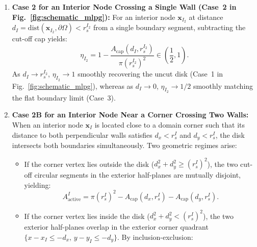 \documentclass[preprint,12pt]{elsarticle}
\begin{document}
\begin{enumerate}
          \begin{equation}
              \eta_B(d_{\parallel}) = \frac{1}{2} \left( 1 - \frac{A_{\mathrm{cap}}(d_{\parallel}, r_s^B)}{\pi (r_s^B)^2} \right) \in \left[ \frac{1}{4}, \frac{1}{2} \right),
              \label{eq:eta_boundary_near_corner}
          \end{equation}
          with $A_{\mathrm{active}}^B = \eta_B(d_{\parallel}) \pi (r_s^B)^2$. Equation~\eqref{eq:eta_boundary_near_corner} provides a continuous, exact transition between the interior-wall half-disk ($\eta \to 1/2$ as $d_{\parallel} \to r_s^B$) and the corner vertex quarter-disk ($\eta \to 1/4$ as $d_{\parallel} \to 0$).
    \item \textbf{Case 2 for an Interior Node Crossing a Single Wall (Case~2 in Fig.~\ref{fig:schematic_mlpg}):} For an interior node $\mathbf{x}_{I_2}$ at distance $d_I = \mathrm{dist}(\mathbf{x}_{I_2}, \partial\Omega) < r_s^{I_2}$ from a single boundary segment, subtracting the cut-off cap yields:
          \begin{equation}
              \eta_{I_2} = 1 - \frac{A_{\mathrm{cap}}(d_I, r_s^{I_2})}{\pi (r_s^{I_2})^2} \in \left( \frac{1}{2}, 1 \right).
              \label{eq:eta_circular_cap}
          \end{equation}
          As $d_I \to r_s^{I_2}$, $\eta_{I_2} \to 1$ smoothly recovering the uncut disk (Case~1 in Fig.~\ref{fig:schematic_mlpg}), whereas as $d_I \to 0$, $\eta_{I_2} \to 1/2$ smoothly matching the flat boundary limit (Case~3).
    \item \textbf{Case 2B for an Interior Node Near a Corner Crossing Two Walls:} When an interior node $\mathbf{x}_I$ is located close to a domain corner such that its distance to both perpendicular walls satisfies $d_x < r_s^I$ and $d_y < r_s^I$, the disk intersects both boundaries simultaneously. Two geometric regimes arise:
          \begin{itemize}
              \item If the corner vertex lies outside the disk ($d_x^2 + d_y^2 \ge (r_s^I)^2$), the two cut-off circular segments in the exterior half-planes are mutually disjoint, yielding:
                    \begin{equation}
                        A_{\mathrm{active}}^I = \pi (r_s^I)^2 - A_{\mathrm{cap}}(d_x, r_s^I) - A_{\mathrm{cap}}(d_y, r_s^I).
                        \label{eq:eta_interior_corner_disjoint}
                    \end{equation}
              \item If the corner vertex lies inside the disk ($d_x^2 + d_y^2 < (r_s^I)^2$), the two exterior half-planes overlap in the exterior corner quadrant $\{x - x_I \le -d_x, \, y - y_I \le -d_y\}$. By inclusion-exclusion:

\end{itemize}
\end{enumerate}
\end{document}
